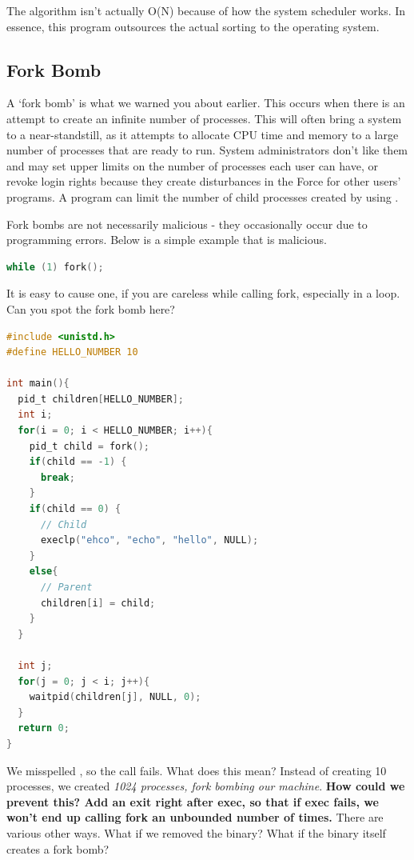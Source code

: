The algorithm isn't actually O(N) because of how the system scheduler works.
In essence, this program outsources the actual sorting to the operating system.

\subsection{Fork Bomb}

A `fork bomb' is what we warned you about earlier.
This occurs when there is an attempt to create an infinite number of processes.
This will often bring a system to a near-standstill, as it attempts to allocate CPU time and memory to a large number of processes that are ready to run.
System administrators don't like them and may set upper limits on the number of processes each user can have, or revoke login rights because they create disturbances in the Force for other users' programs.
A program can limit the number of child processes created by using .

Fork bombs are not necessarily malicious - they occasionally occur due to programming errors.
Below is a simple example that is malicious.

\begin{lstlisting}[language=C]
while (1) fork();
\end{lstlisting}

It is easy to cause one, if you are careless while calling fork, especially in a loop.
Can you spot the fork bomb here?

\begin{lstlisting}[language=C]
#include <unistd.h>
#define HELLO_NUMBER 10

int main(){
  pid_t children[HELLO_NUMBER];
  int i;
  for(i = 0; i < HELLO_NUMBER; i++){
    pid_t child = fork();
    if(child == -1) {
      break;
    }
    if(child == 0) {
      // Child
      execlp("ehco", "echo", "hello", NULL);
    }
    else{
      // Parent
      children[i] = child;
    }
  }

  int j;
  for(j = 0; j < i; j++){
    waitpid(children[j], NULL, 0);
  }
  return 0;
}
\end{lstlisting}

We misspelled , so the  call fails.
What does this mean? Instead of creating 10 processes, we created \emph{1024 processes, fork bombing our machine}. \textbf{How could we prevent this? Add an exit right after exec, so that if exec fails, we won't end up calling fork an unbounded number of times.}
There are various other ways. What if we removed the  binary? What if the binary itself creates a fork bomb?

